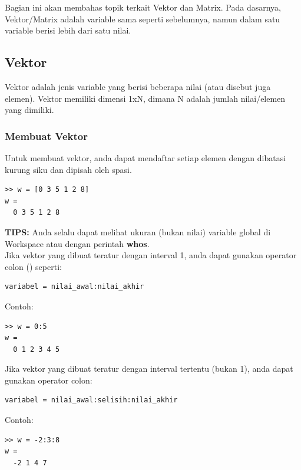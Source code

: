 \documentclass[12pt]{book}
\begin{document}
	Bagian ini akan membahas topik terkait Vektor dan Matrix.
	Pada dasarnya, Vektor/Matrix adalah variable sama seperti sebelumnya,
	namun dalam satu variable berisi lebih dari satu nilai.
	
	\subsection{Vektor}
	
	Vektor adalah jenis variable yang berisi beberapa nilai (atau disebut juga elemen).
	Vektor memiliki dimensi 1xN, dimana N adalah jumlah nilai/elemen yang dimiliki.
	
	\subsubsection{Membuat Vektor}
		
	Untuk membuat vektor, anda dapat mendaftar setiap elemen dengan dibatasi kurung siku dan dipisah oleh spasi.
	\begin{verbatim}
>> w = [0 3 5 1 2 8]
w = 
  0 3 5 1 2 8
	\end{verbatim}

	\textbf{TIPS:} Anda selalu dapat melihat ukuran (bukan nilai) variable global di Workspace atau dengan perintah \textbf{whos}.\\
	
	\newpage
	Jika vektor yang dibuat teratur dengan interval 1, anda dapat gunakan operator colon (\keys{:}) seperti:
	\begin{verbatim}
variabel = nilai_awal:nilai_akhir
	\end{verbatim}

	Contoh:
	\begin{verbatim}
>> w = 0:5
w = 
  0 1 2 3 4 5
	\end{verbatim}

	Jika vektor yang dibuat teratur dengan interval tertentu (bukan 1), anda dapat gunakan operator colon:
	\begin{verbatim}
variabel = nilai_awal:selisih:nilai_akhir
	\end{verbatim}

	Contoh:
	\begin{verbatim}
>> w = -2:3:8
w = 
  -2 1 4 7
	\end{verbatim}
\end{document}
